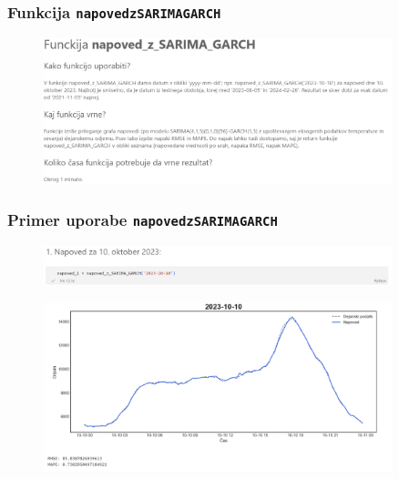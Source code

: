 \documentclass[14p, hyperref={unicode}]{beamer}
\begin{document}

\begin{frame}
    
    \frametitle{Funkcija \texttt{napoved\underline{\enskip}z\underline{\enskip}SARIMA\underline{\enskip}GARCH}} 

    \begin{figure}[h!]
        \centering
        \includegraphics[width=0.9\textwidth]{opis_funkcije.png}
    \end{figure}

\end{frame}



\begin{frame}
    
    \frametitle{Primer uporabe \texttt{napoved\underline{\enskip}z\underline{\enskip}SARIMA\underline{\enskip}GARCH}} 

    \begin{figure}[h!]
        \centering
        \includegraphics[width=0.9\textwidth]{koda.png}
    \end{figure}

    \begin{figure}[h!]
        \centering
        \includegraphics[width=0.9\textwidth]{izpis_funkcije.png}
    \end{figure}

\end{frame}










\end{document}
